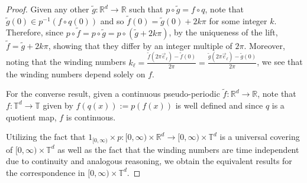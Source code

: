 \documentclass[a4paper,11pt]{amsart}
\newcommand{\red}[1]{{#1}}
\newcommand{\R}{\mathbb{R}}
\newcommand{\T}{\mathbb{T}}
\newcommand{\Z}{\mathbb{Z}}
\numberwithin{equation}{section}
\numberwithin{theorem}{section}
\theoremstyle{definition}
\begin{document}
{\begin{proof}
Given any other $\tilde g:\mathbb{R}^d \to \mathbb{R}$ such that $p \circ \tilde g = f \circ q$, note that $\tilde g(0) \in p^{-1}(f \circ q(0))$ and so $\tilde f(0) = \tilde g(0) + 2k\pi$ for some integer $k$. Therefore, since $p \circ \tilde f = p \circ \tilde g = p \circ (\tilde g + 2k\pi)$, by the uniqueness of the lift, $\tilde f = \tilde g + 2k\pi$, showing that they differ by an integer multiple of $2\pi$. Moreover, noting that the winding numbers $k_{\ell} = \frac{\tilde f(2\pi \vec e_\ell) - \tilde f(0)}{2\pi} = \frac{\tilde g(2\pi \vec e_\ell) - \tilde g(0)}{2\pi}$, we see that the winding numbers depend solely on $f$.

For the converse result, given a continuous pseudo-periodic $\tilde f:\mathbb{R}^d \to \mathbb{R}$, note that $f :\mathbb{T}^d \to \mathbb{T}$ given by $f(q(x)) := p(f(x))$ is well defined and since $q$ is a quotient map, $f$ is continuous.

Utilizing the fact that $\red{1_{[0,\infty)} \times p:[0,\infty) \times \mathbb{R}^d \to [0,\infty) \times \mathbb{T}^d}$ is a universal covering of $[0,\infty) \times \mathbb{T}^d$ as well as the fact that the winding numbers are time independent due to continuity and analogous reasoning, we obtain the equivalent results for the correspondence in $[0,\infty) \times \mathbb{T}^d$.
\end{proof}




}
\end{document}
